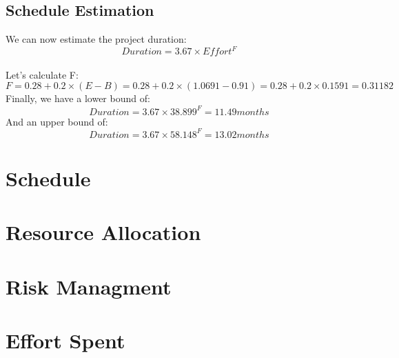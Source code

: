 \documentclass{article}
\begin{document}
\subsection{Schedule Estimation}
We can now estimate the project duration:\\
$$\displaystyle Duration = 3.67 \times Effort^F $$ \\
Let's calculate F:\\
$$\displaystyle F = 0.28 + 0.2 \times (E - B) = 0.28 + 0.2\times (1.0691 - 0.91) = 0.28 + 0.2\times 0.1591 = 0.31182 $$
Finally, we have a lower bound of:\\
$$\displaystyle Duration = 3.67 \times 38.899^F = 11.49 months $$ 
And an upper bound of:\\
$$\displaystyle Duration = 3.67 \times 58.148^F = 13.02 months $$ 
\newpage
\section{Schedule}

\newpage
\section{Resource Allocation}

\newpage
\section{Risk Managment}

\newpage
\section{Effort Spent}
\end{document}
